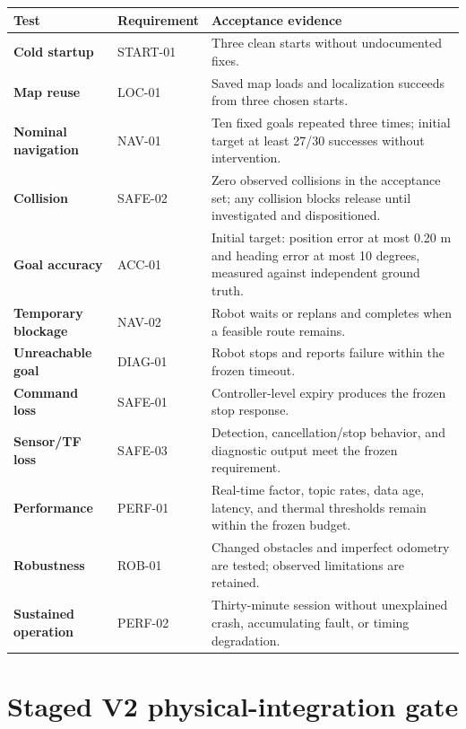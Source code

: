 \documentclass[10pt,a4paper]{article}
\begin{document}
\begin{longtable}{>{\bfseries}p{38mm}p{27mm}p{98mm}}
\toprule
Test & Requirement & Acceptance evidence \\
\midrule
\endhead
Cold startup & START-01 & Three clean starts without undocumented fixes. \\
Map reuse & LOC-01 & Saved map loads and localization succeeds from three chosen starts. \\
Nominal navigation & NAV-01 & Ten fixed goals repeated three times; initial target at least 27/30 successes without intervention. \\
Collision & SAFE-02 & Zero observed collisions in the acceptance set; any collision blocks release until investigated and dispositioned. \\
Goal accuracy & ACC-01 & Initial target: position error at most 0.20 m and heading error at most 10 degrees, measured against independent ground truth. \\
Temporary blockage & NAV-02 & Robot waits or replans and completes when a feasible route remains. \\
Unreachable goal & DIAG-01 & Robot stops and reports failure within the frozen timeout. \\
Command loss & SAFE-01 & Controller-level expiry produces the frozen stop response. \\
Sensor/TF loss & SAFE-03 & Detection, cancellation/stop behavior, and diagnostic output meet the frozen requirement. \\
Performance & PERF-01 & Real-time factor, topic rates, data age, latency, and thermal thresholds remain within the frozen budget. \\
Robustness & ROB-01 & Changed obstacles and imperfect odometry are tested; observed limitations are retained. \\
Sustained operation & PERF-02 & Thirty-minute session without unexplained crash, accumulating fault, or timing degradation. \\
\bottomrule
\end{longtable}

\section{Staged V2 physical-integration gate}
\end{document}
